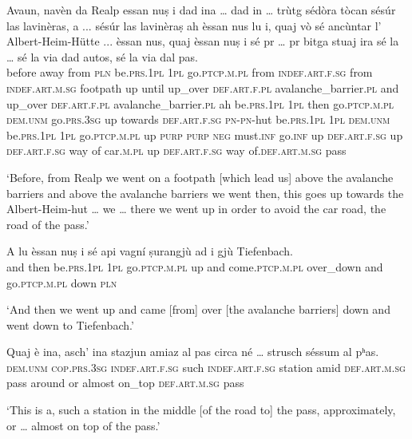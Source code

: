 \begin{linenumbers}
\gll  Avaun, navèn da Realp essan nuṣ i dad ina … dad in … trùtg sédòra tòcan sésúr las lavinèras, a ... sésúr las lavinèraṣ ah èssan nus lu i, quaj vò sé ancùntar l’ Albert-Heim-Hütte\footnotemark{} ... èssan nus, quaj èssan nuṣ i sé pr … pr bitga stuaj ira sé la … sé la via dad autos, sé la via dal pas. \\
before away from \textsc{pln} be.\textsc{prs.1pl} \textsc{1pl} go.\textsc{ptcp.m.pl} from \textsc{indef.art.f.sg} {} from \textsc{indef.art.m.sg} {} footpath up until up\_over \textsc{def.art.f.pl} avalanche\_barrier.\textsc{pl} and up\_over  \textsc{def.art.f.pl} avalanche\_barrier.\textsc{pl} ah be.\textsc{prs.1pl} \textsc{1pl} then go.\textsc{ptcp.m.pl} \textsc{dem.unm} go.\textsc{prs.3sg} up towards \textsc{def.art.f.sg} \textsc{pn}-\textsc{pn}-hut {} be.\textsc{prs.1pl} \textsc{1pl} \textsc{dem.unm} be.\textsc{prs.1pl} \textsc{1pl} go.\textsc{ptcp.m.pl} up \textsc{purp} {} \textsc{purp} \textsc{neg} must.\textsc{inf} go.\textsc{inf} up \textsc{def.art.f.sg} {} up \textsc{def.art.f.sg} way of car.\textsc{m.pl} up \textsc{def.art.f.sg} way of.\textsc{def.art.m.sg} pass  \\
\end{linenumbers}
\medskip
\glt `Before, from Realp we went on a footpath [which lead us] above the avalanche barriers and above the avalanche barriers we went then, this goes up towards the Albert-Heim-hut … we … there we went up in order to avoid the car road, the road of the pass.'
\medskip

\begin{linenumbers}
\gll A lu èssan nuṣ i sé api vagní ṣurangjù ad i gjù Tiefenbach.\\
and then be.\textsc{prs.1pl} \textsc{1pl} go.\textsc{ptcp.m.pl} up and come.\textsc{ptcp.m.pl} over\_down and go.\textsc{ptcp.m.pl} down \textsc{pln} \\
\end{linenumbers} 
\medskip
\glt `And then we went up and came [from] over [the avalanche barriers] down and went down to Tiefenbach.'
\medskip

\begin{linenumbers}
\gll Quaj è ina, asch’ ina stazjun amiaz al pas circa né … strusch séssum al pʰas.   \\
 \textsc{dem.unm} \textsc{cop.prs.3sg} \textsc{indef.art.f.sg} such \textsc{indef.art.f.sg} station amid \textsc{def.art.m.sg} pass around or {} almost on\_top \textsc{def.art.m.sg} pass\\
\end{linenumbers}
\medskip
\glt `This is a, such a station in the middle [of the road to] the pass, approximately, or … almost on top of the pass.'
\medskip

